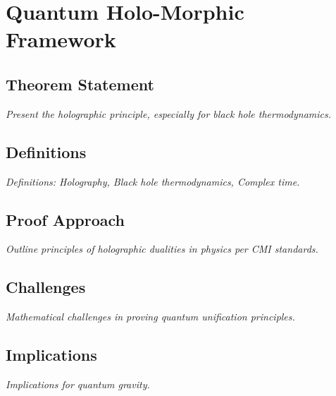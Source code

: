 \documentclass[12pt, a4paper]{article}
\begin{document}

\section{Quantum Holo-Morphic Framework}
\subsection{Theorem Statement}
\begin{theorem}
\label{thm:quantum_holo}
\textit{Present the holographic principle, especially for black hole thermodynamics.}
\end{theorem}

\subsection{Definitions}
\textit{Definitions: Holography, Black hole thermodynamics, Complex time.}

\subsection{Proof Approach}
\textit{Outline principles of holographic dualities in physics per CMI standards.}

\subsection{Challenges}
\textit{Mathematical challenges in proving quantum unification principles.}

\subsection{Implications}
\textit{Implications for quantum gravity.}

\end{document}

